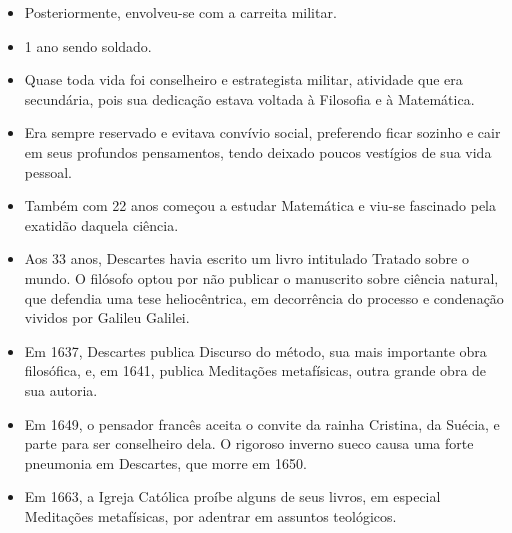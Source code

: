 \documentclass{beamer}
\begin{document}
\begin{frame}
    \begin{block}{}
        \begin{itemize}
            \item Posteriormente, envolveu-se com a carreita militar.
            \item 1 ano sendo soldado.
            \item Quase toda vida foi conselheiro e estrategista militar, atividade que era secundária, pois sua dedicação estava voltada à Filosofia e à Matemática.
            \item Era sempre reservado e evitava convívio social, preferendo ficar sozinho e cair em seus profundos pensamentos, tendo deixado poucos vestígios de sua vida pessoal.
        \end{itemize}
    \end{block}  
\end{frame}


\begin{frame}
    \begin{block}{}
        \begin{itemize}
            \item Também com 22 anos começou a estudar Matemática e viu-se fascinado pela exatidão daquela ciência. 
            \item Aos 33 anos, Descartes havia escrito um livro intitulado Tratado sobre o mundo. O filósofo optou por não publicar o manuscrito sobre ciência natural, que defendia uma tese heliocêntrica, em decorrência do processo e condenação vividos por Galileu Galilei.
            \item Em 1637, Descartes publica Discurso do método, sua mais importante obra filosófica, e, em 1641, publica Meditações metafísicas, outra grande obra de sua autoria. 
            \item Em 1649, o pensador francês aceita o convite da rainha Cristina, da Suécia, e parte para ser conselheiro dela. O rigoroso inverno sueco causa uma forte pneumonia em Descartes, que morre em 1650. 
            \item Em 1663, a Igreja Católica proíbe alguns de seus livros, em especial Meditações metafísicas, por adentrar em assuntos teológicos.      
        \end{itemize}
    \end{block}  
\end{frame}
\end{document}
